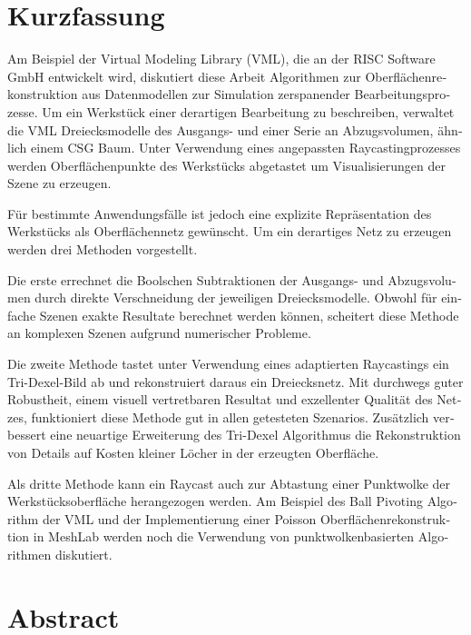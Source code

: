 \chapter*{Kurzfassung}

\begin{otherlanguage}{ngerman}
	Am Beispiel der Virtual Modeling Library (VML), die an der RISC Software GmbH entwickelt wird, diskutiert diese Arbeit Algorithmen zur Oberflächenrekonstruktion aus Datenmodellen zur Simulation zerspanender Bearbeitungsprozesse.
	Um ein Werkstück einer derartigen Bearbeitung zu beschreiben, verwaltet die VML Dreiecksmodelle des Ausgangs- und einer Serie an Abzugsvolumen, ähnlich einem CSG Baum.
	Unter Verwendung eines angepassten Raycastingprozesses werden Oberflächenpunkte des Werkstücks abgetastet um Visualisierungen der Szene zu erzeugen.
	
	Für bestimmte Anwendungsfälle ist jedoch eine explizite Repräsentation des Werkstücks als Oberflächennetz gewünscht.
	Um ein derartiges Netz zu erzeugen werden drei Methoden vorgestellt.
	
	Die erste errechnet die Boolschen Subtraktionen der Ausgangs- und Abzugsvolumen durch direkte Verschneidung der jeweiligen Dreiecksmodelle.
	Obwohl für einfache Szenen exakte Resultate berechnet werden können, scheitert diese Methode an komplexen Szenen aufgrund numerischer Probleme.
	
	Die zweite Methode tastet unter Verwendung eines adaptierten Raycastings ein Tri-Dexel-Bild ab und rekonstruiert daraus ein Dreiecksnetz.
	Mit durchwegs guter Robustheit, einem visuell vertretbaren Resultat und exzellenter Qualität des Netzes, funktioniert diese Methode gut in allen getesteten Szenarios.
	Zusätzlich verbessert eine neuartige Erweiterung des Tri-Dexel Algorithmus die Rekonstruktion von Details auf Kosten kleiner Löcher in der erzeugten Oberfläche.
	
	Als dritte Methode kann ein Raycast auch zur Abtastung einer Punktwolke der Werkstücksoberfläche herangezogen werden.
	Am Beispiel des Ball Pivoting Algorithm der VML und der Implementierung einer Poisson Oberflächenrekonstruktion in MeshLab werden noch die Verwendung von punktwolkenbasierten Algorithmen diskutiert.
\end{otherlanguage}

\pagebreak

\chapter*{Abstract}

